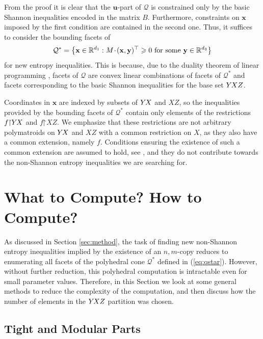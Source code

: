 \documentclass[reqno]{amsart}
\theoremstyle{definition}
\newcommand\tsp{\mkern 1.5mu}
\def\restr{\mathord\upharpoonright}
\renewcommand\ge{\geqslant}\renewcommand\le{\leqslant}
\newcommand\R{\mathbb R}  %
\newcommand\T{\top}       %
\def\m#1{\tsp{#1}\tsp}
\def\YXZ{Y\mkern-2mu XZ}
\def\YX{Y\mkern-2mu X}
\begin{document}
From the proof it is clear that the $\mathbf u$-part of $\mathcal Q$ is
constrained only by the basic Shannon inequalities encoded in the matrix
$B$. Furthermore, constraints on $\mathbf x$ imposed by the first condition
are contained in the second one. Thus, it suffices to consider the bounding
facets of
\begin{equation}\label{eq:qstar}
   \mathcal Q^* = \big\{ \mathbf x\in\R^{d_1}:
     M\m\cdot(\mathbf x,\mathbf y)^\T\ge 0
     \mbox{ for some } \mathbf y\in\R^{d_3}
   \big\}
\end{equation}
for new entropy inequalities. This is because, due to the duality theorem
of linear programming \cite{ziegler}, facets of $\mathcal Q$ are
convex linear combinations of facets of $\mathcal Q^*$ and facets
corresponding to the basic Shannon inequalities for the base set $\YXZ$.

Coordinates in $\mathbf x$ are indexed by subsets of $\YX$ and $XZ$, so the
inequalities provided by the bounding facets of $\mathcal Q^*$ contain only
elements of the restrictions $f\restr \YX$ and $f\restr XZ$. We emphasize
that these restrictions are not arbitrary polymatroids on $\YX$ and $XZ$
with a common restriction on $X$, as they also have a common extension,
namely $f$. Conditions ensuring the existence of such a common extension are
assumed to hold, see \cite{Csirmaz.oneadhesive}, and they do not contribute
towards the non-Shannon entropy inequalities we are searching for.


\section{What to Compute? How to Compute?}\label{sec:prepare}

As discussed in Section \ref{sec:method}, the task of finding new
non-Shannon entropy inequalities implied by the existence of an $n,m$-copy
reduces to enumerating all facets of the polyhedral cone $\mathcal Q^*$
defined in (\ref{eq:qstar}). However, without further reduction, this
polyhedral computation is intractable even for small parameter values.
Therefore, in this Section we look at some general methods to reduce the
complexity of the computation, and then discuss how the number of elements
in the $\YXZ$ partition was chosen.

\subsection{Tight and Modular Parts}
\end{document}
